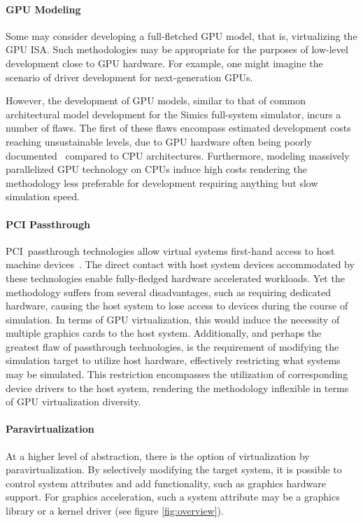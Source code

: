 \paragraph{GPU Modeling}
\label{par:previousresearch_graphicsvirtualization_gpumodeling}
Some may consider developing a full-fletched GPU model, that is, virtualizing the GPU ISA.
Such methodologies may be appropriate for the purposes of low-level development close to GPU hardware.
For example, one might imagine the scenario of driver development for next-generation GPUs.

However, the development of GPU models, similar to that of common architectural model development for the Simics full-system simulator, incurs a number of flaws.
The first of these flaws encompass estimated development costs reaching unsustainable levels, due to GPU hardware often being poorly documented~ compared to CPU architectures.
Furthermore, modeling massively parallelized GPU technology on CPUs induce high costs rendering the methodology less preferable for development requiring anything but slow simulation speed.

\paragraph{PCI Passthrough}
\label{par:previousresearch_graphicsvirtualization_pcipassthrough}
PCI~passthrough technologies allow virtual systems first-hand access to host machine devices~.
The direct contact with host system devices accommodated by these technologies enable fully-fledged hardware accelerated workloads.
Yet the methodology suffers from several disadvantages, such as requiring dedicated hardware, causing the host system to lose access to devices during the course of simulation.
In terms of GPU virtualization, this would induce the necessity of multiple graphics cards to the host system.
Additionally, and perhaps the greatest flaw of passthrough technologies, is the requirement of modifying the simulation target to utilize host hardware, effectively restricting what systems may be simulated.
This restriction encompasses the utilization of corresponding device drivers to the host system, rendering the methodology inflexible in terms of GPU virtualization diversity.

\paragraph{Paravirtualization}
\label{par:previousresearch_graphicsvirtualization_paravirtualization}
At a higher level of abstraction, there is the option of virtualization by paravirtualization.
By selectively modifying the target system, it is possible to control system attributes and add functionality, such as graphics hardware support.
For graphics acceleration, such a system attribute may be a graphics library or a kernel driver (see figure \ref{fig:overview}).

